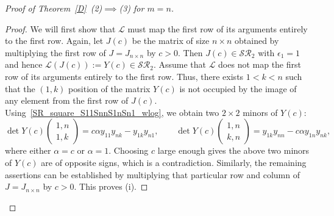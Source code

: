 \documentclass[11pt,reqno]{amsart}
\theoremstyle{plain}
\theoremstyle{definition}
\numberwithin{equation}{section}
\begin{document}
\begin{proof}[Proof of Theorem~\ref{D}~(2)$\implies$(3) for $m=n$]
	\begin{proof}
		We will first show that $\mathcal{L}$ must map the first row of its arguments entirely to the first row. Again, let $J(c)$ be the matrix of size $n\times n$ obtained by multiplying the first row of $J=J_{n\times n}$ by $c>0$. Then $J(c)\in \mathcal{SR}_2$ with $\epsilon_1=1$ and hence $\mathcal{L}(J(c)):=Y(c)\in\mathcal{SR}_2$. Assume that $\mathcal{L}$ does not map the first row of its arguments entirely to the first row. Thus, there exists $1<k<n$ such that the $(1,k)$ position of the matrix $Y(c)$ is not occupied by the image of any element from the first row of $J(c)$. Using~\eqref{SR_square_S11SnnS1nSn1_wlog}, we obtain two $2 \times2$ minors of $Y(c)$:
		\[ \det Y(c)\begin{pmatrix}1,n\\1,k
		\end{pmatrix}=c\alpha
		y_{11}y_{nk}-y_{1k}y_{n1}, \qquad
		\det Y(c)\begin{pmatrix}1,n\\k,n
		\end{pmatrix}=y_{1k}y_{nn}-c\alpha
		y_{1n}y_{nk},\]
		where  either $\alpha=c$ or $\alpha=1$. Choosing $c$ large enough gives the above two minors of $Y(c)$ are of opposite signs, which is a contradiction. Similarly, the remaining assertions can be established by multiplying that particular row and column of $J=J_{n\times n}$ by $c>0$. This proves (i).
		

\end{proof}
\end{proof}
\end{document}
